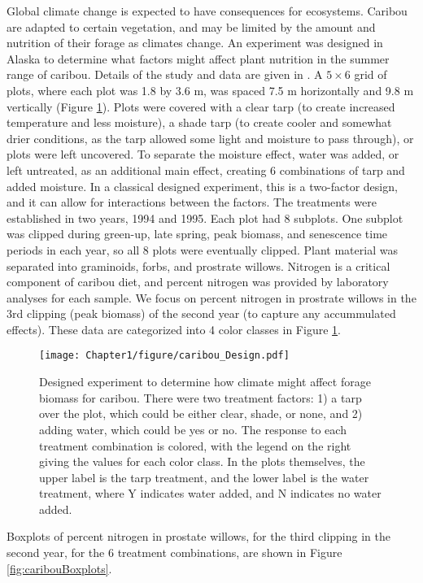 Global climate change is expected to have consequences for ecosystems.  Caribou are adapted to certain vegetation, and may be limited by the amount and nutrition of their forage as climates change. An experiment was designed in Alaska to determine what factors might affect plant nutrition in the summer range of caribou. Details of the study and data are given in \citet{lenart2002climate}. A $5 \times 6$ grid of plots, where each plot was 1.8 by 3.6 m, was spaced 7.5 m horizontally and 9.8 m vertically (Figure \ref{fig:caribouDesign}).  Plots were covered with a clear tarp (to create increased temperature and less moisture), a shade tarp (to create cooler and somewhat drier conditions, as the tarp allowed some light and moisture to pass through), or plots were left uncovered.  To separate the moisture effect, water was added, or left untreated, as an additional main effect, creating 6 combinations of tarp and added moisture.  In a classical designed experiment, this is a two-factor design, and it can allow for interactions between the factors.  The treatments were established in two years, 1994 and 1995. Each plot had 8 subplots. One subplot was clipped during green-up, late spring, peak biomass, and senescence time periods in each year, so all 8 plots were eventually clipped. Plant material was separated into graminoids, forbs, and prostrate willows.  Nitrogen is a critical component of caribou diet, and percent nitrogen was provided by laboratory analyses for each sample. We focus on percent nitrogen in prostrate willows in the 3rd clipping (peak biomass) of the second year (to capture any accummulated effects).  These data are categorized into 4 color classes in Figure \ref{fig:caribouDesign}.  
%
\begin{figure}
\begin{center}
\texttt{[image: Chapter1/figure/caribou\_Design.pdf]}
\caption{Designed experiment to determine how climate might affect forage biomass for caribou.  There were two treatment factors: 1) a tarp over the plot, which could be either clear, shade, or none, and 2) adding water, which could be yes or no.  The response to each treatment combination is colored, with the legend on the right giving the values for each color class.  In the plots themselves, the upper label is the tarp treatment, and the lower label is the water treatment, where Y indicates water added, and N indicates no water added.
\label{fig:caribouDesign}}
\end{center}
\end{figure}
%
Boxplots of percent nitrogen in prostate willows, for the third clipping in the second year, for the 6 treatment combinations, are shown in Figure \ref{fig:caribouBoxplots}.
